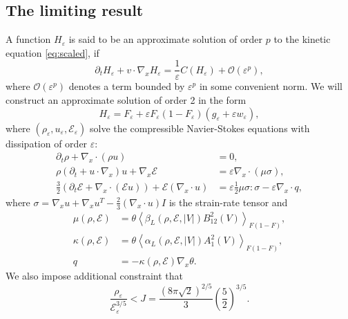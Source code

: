 \subsection{The limiting result}
A function $H_\varepsilon$ is said to be an approximate solution of order $p$ to 
the kinetic equation \eqref{eq:scaled}, if 
\begin{equation}\label{eq:Heq}
\partial_t H_\varepsilon +v\cdot \nabla_xH_\varepsilon =\frac{1}{\varepsilon }C(H_\varepsilon ) +\mathcal O(\varepsilon ^p),
\end{equation}
where $\mathcal O(\varepsilon ^p)$ denotes a term bounded by $ \varepsilon ^p $ in some convenient norm. We will construct an approximate solution of order 2 in the form
\begin{equation}\label{eq:Hform}
 H_\varepsilon  =F_\varepsilon+\varepsilon F_\varepsilon(1-F_\varepsilon)(g_\varepsilon+\varepsilon w_\varepsilon),
\end{equation}
where $(\rho_\varepsilon,u_\varepsilon,\mathcal E_\varepsilon)$ solve the compressible Navier-Stokes equations with dissipation of order $\varepsilon$:
\begin{equation}\label{eq:CSNE}
\begin{aligned}
\partial_t \rho + \nabla_x\cdot (\rho u) &= 0,\\
\rho(\partial_t +u\cdot\nabla_x)u + \nabla_x\mathcal E &=
\varepsilon\nabla_x\cdot (\mu\sigma),\\
\frac 32 (\partial_t\mathcal E +\nabla_x\cdot (\mathcal Eu))+\mathcal
E(\nabla_x\cdot u) &
= \varepsilon\frac 12 \mu\sigma:\sigma-\varepsilon\nabla_x\cdot q,
\end{aligned}
\end{equation}
where $\sigma = \nabla_x u +\nabla_x u^T - \frac 23 (\nabla_x  \cdot u)I$ is the strain-rate tensor and
 \begin{equation}\label{eq:visc}
 \begin{aligned}
 \mu(\rho,\mathcal E) &= \theta \left\langle \beta_L(\rho,\mathcal E,|V|)  B_{12}^2(V)\right\rangle_{F(1-F)}, \\
  \kappa(\rho,\mathcal E) &= \theta \left\langle \alpha_L(\rho,\mathcal E,|V|)  A_{1}^2(V)\right\rangle_{F(1-F)}, \\
 q&= -  \kappa(\rho,\mathcal E)\nabla_x\theta.
 \end{aligned}
 \end{equation}
 We also impose additional constraint that 
\begin{equation}
 \label{cond:existenceE}\frac{\rho_\varepsilon}{\mathcal
E_\varepsilon^{3/5}}<J=\frac{(8\pi\sqrt 2)^{2/5}}{3}\left(\frac 52 \right)^{3/5}.
\end{equation}


